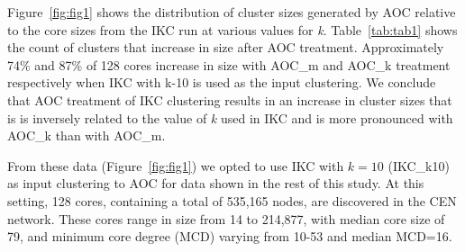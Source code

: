 \documentclass[11pt, oneside]{article}   	%
\begin{document}
Figure~\ref{fig:fig1} shows the distribution of cluster sizes generated by AOC relative to the core sizes from the IKC run at various values for \emph{k}. Table~\ref{tab:tab1} shows the count of clusters that increase in size
after AOC treatment. Approximately 74\% and 87\% of  128 cores increase in size with AOC\_m and AOC\_k treatment respectively when IKC with k-10 is used as the input clustering. We conclude that AOC treatment of IKC clustering results in an increase in cluster sizes that is is inversely related to the value of \emph{k} used in IKC and is more pronounced with AOC\_k than with AOC\_m. 

From these data (Figure~\ref{fig:fig1}) we opted to use IKC with  $k=10$  (IKC\_k10) as input clustering to AOC for data shown in the rest of this study. At this setting, 128 cores, containing a total of 535,165 nodes, are discovered in the CEN network. These cores range in size from 14 to 214,877, with median core size of 79, and minimum core degree (MCD) varying from 10-53 and median MCD=16. %
\end{document}
